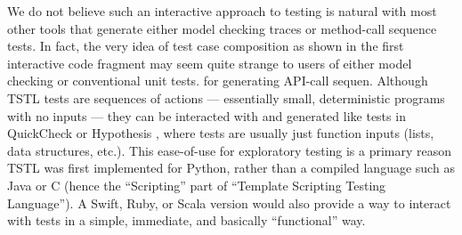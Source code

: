 We do not believe such an interactive approach to testing is natural with most other tools that generate either model checking traces or method-call sequence tests.  In fact, the very idea of test case composition as shown in the first interactive code fragment may seem quite strange to users of either model checking or conventional unit tests. for generating API-call sequen.  Although TSTL tests are sequences of actions --- essentially small, deterministic programs with no inputs --- they can be interacted with and generated like tests in QuickCheck \cite{ClaessenH00} or Hypothesis \cite{hypothesis}, where tests are usually just function inputs (lists, data structures, etc.). This ease-of-use for exploratory testing is a primary reason TSTL was first implemented for Python, rather than a compiled language such as Java or C (hence the ``Scripting'' part of ``Template Scripting Testing Language'').  A Swift, Ruby, or Scala version would also provide a way to interact with tests in a simple, immediate, and basically ``functional'' way.

